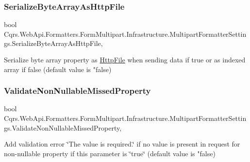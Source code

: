 \subsubsection{\texorpdfstring{Serialize\+Byte\+Array\+As\+Http\+File}{SerializeByteArrayAsHttpFile}}
{\footnotesize\ttfamily bool Cqrs.\+Web\+Api.\+Formatters.\+Form\+Multipart.\+Infrastructure.\+Multipart\+Formatter\+Settings.\+Serialize\+Byte\+Array\+As\+Http\+File\hspace{0.3cm}{\ttfamily [get]}, {\ttfamily [set]}}



Serialize byte array property as \hyperlink{classCqrs_1_1WebApi_1_1Formatters_1_1FormMultipart_1_1Infrastructure_1_1HttpFile}{Http\+File} when sending data if true or as indexed array if false (default value is "false) 

\mbox{\label{classCqrs_1_1WebApi_1_1Formatters_1_1FormMultipart_1_1Infrastructure_1_1MultipartFormatterSettings_a8db49349b200f3aea3fc9642ca1f9fd9_a8db49349b200f3aea3fc9642ca1f9fd9}} 
\subsubsection{\texorpdfstring{Validate\+Non\+Nullable\+Missed\+Property}{ValidateNonNullableMissedProperty}}
{\footnotesize\ttfamily bool Cqrs.\+Web\+Api.\+Formatters.\+Form\+Multipart.\+Infrastructure.\+Multipart\+Formatter\+Settings.\+Validate\+Non\+Nullable\+Missed\+Property\hspace{0.3cm}{\ttfamily [get]}, {\ttfamily [set]}}



Add validation error \char`\"{}\+The value is required.\char`\"{} if no value is present in request for non-\/nullable property if this parameter is \char`\"{}true\char`\"{} (default value is "false) 

